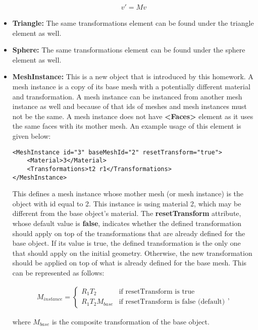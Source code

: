 \documentclass[12pt]{article}
\begin{document}
\begin{itemize}
\begin{align}
v' = M v
\end{align}

\item \textbf{Triangle:} The same transformations element can be found
under the triangle element as well.

\item \textbf{Sphere:} The same transformations element can be found
under the sphere element as well.

\item \textbf{MeshInstance:} This is a new object that is introduced by
this homework. A mesh instance is a copy of its base mesh with a
potentially different material and transformation. A mesh instance can
be instanced from another mesh instance as well and because of that ids
of meshes and mesh instances must not be the same. A mesh instance does
not have \textbf{\textless Faces\textgreater} element as it uses the same faces
with its mother mesh. An example usage of this element is given below:

\begin{verbatim}
<MeshInstance id="3" baseMeshId="2" resetTransform="true">
    <Material>3</Material>
    <Transformations>t2 r1</Transformations>
</MeshInstance>
\end{verbatim}

This defines a mesh instance whose mother mesh (or mesh instance) is the
object with id equal to 2. This instance is using material 2, which may
be different from the base object's material. The \textbf{resetTransform} 
attribute, whose default value is \textbf{false}, indicates
whether the defined transformation should apply on top of the
transformations that are already defined for the base object. If its
value is true, the defined transformation is the only one that should
apply on the initial geometry. Otherwise, the new transformation should
be applied on top of what is already defined for the base mesh. This can
be represented as follows:

\begin{align}
M_{instance} = 
\begin{cases}
R_1 T_2 & \textrm{if resetTransform is true}\\
R_1 T_2 M_{base} & \textrm{if resetTransform is false (default)}
\end{cases},
\end{align}

where $M_{base}$ is the composite transformation of the base object.

\end{itemize}
\end{document}
